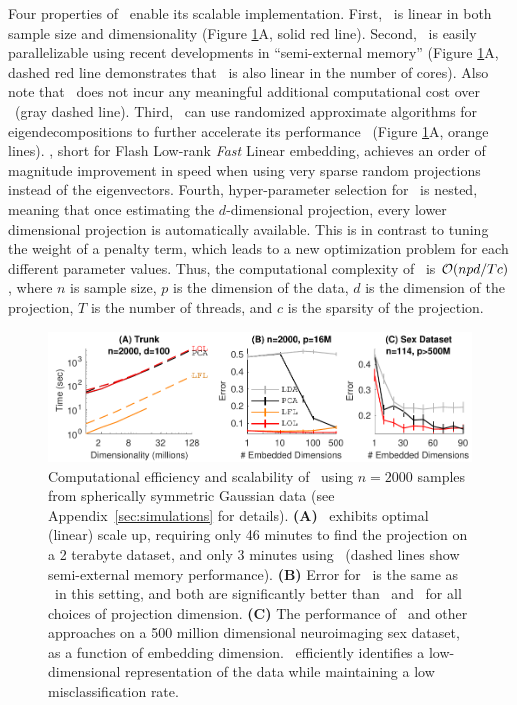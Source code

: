 \documentclass[11pt]{extarticle}
\begin{document}
Four properties of \Lol~enable its scalable implementation. 
First, \Lol~is linear in both sample size and dimensionality (Figure \ref{f:speed}{\color{magenta}A}, solid red line).
Second, \Lol~is easily parallelizable using recent developments in ``semi-external memory'' \cite{FlashGraph, FlashMatrix, FlashEigen} 
(Figure \ref{f:speed}{\color{magenta}A}, dashed red line demonstrates that \Lol~is also linear in the number of cores).
Also note that \Lol~does not incur any meaningful additional computational cost over \Pca~(gray dashed line).
Third,  \Lol~can use  randomized approximate algorithms for eigendecompositions to further accelerate its performance~\cite{Candes2006b, Hastie2006}  (Figure \ref{f:speed}{\color{magenta}A}, orange lines).
, short for Flash Low-rank \emph{Fast} Linear embedding, achieves an order of magnitude improvement in speed when using very sparse random projections instead of the eigenvectors.
%
Fourth, hyper-parameter selection for \Lol~is nested, meaning that once estimating the $d$-dimensional projection, every lower dimensional projection is automatically available.  This is in contrast to tuning the weight of a penalty term, which leads to a new optimization problem for each different parameter values.
Thus, the computational complexity of \Lol~is $\mathcal{O}(npd/Tc)$, where $n$ is sample size, $p$ is the dimension of the data, $d$ is the dimension of the projection, $T$ is the number of threads, and $c$ is the sparsity of the projection.





\begin{figure}[h!]
\centering
\includegraphics[width=1\linewidth]{scalability}
\caption{
Computational efficiency and scalability of \Lol~using $n=2000$ samples from spherically symmetric  Gaussian data  (see Appendix~\ref{sec:simulations} for details).   \textbf{(A)} \Lol~exhibits optimal (linear) scale up, requiring only 46 minutes to find the projection on a 2 terabyte dataset, and only 3 minutes using \Lfl~(dashed lines show semi-external memory performance). \textbf{(B)} Error for \Lfl~is the same as \Lol~in this setting, and both are significantly better than \Pca~and \Lda~for all choices of projection dimension. \textbf{(C)} The performance of \Lol~and other approaches on a 500 million dimensional neuroimaging sex dataset, as a function of embedding dimension. \Lol~efficiently identifies a low-dimensional representation of the data while maintaining a low misclassification rate.
}
\label{f:speed}
\end{figure}
\end{document}

